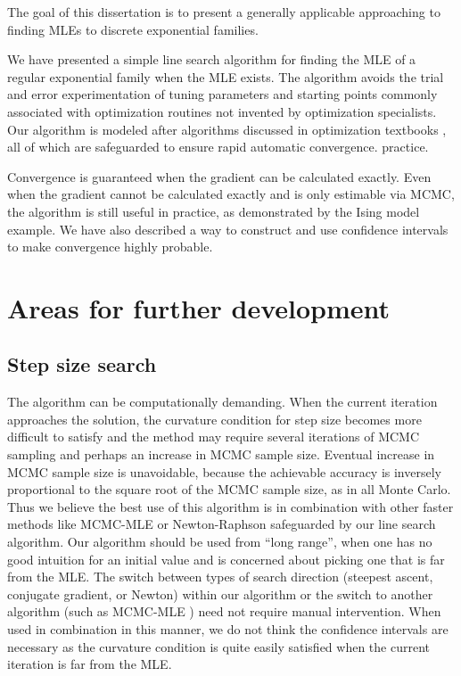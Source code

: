 The goal of this dissertation is to present a generally applicable approaching
to finding MLEs to discrete exponential families.

We have presented a simple line search algorithm for finding the MLE of a regular 
exponential family when the MLE 
exists.  The algorithm avoids the trial and error experimentation of tuning parameters 
and starting points commonly associated with optimization routines
not invented by optimization specialists.  Our algorithm is modeled after algorithms 
discussed in optimization textbooks \citep{Fletcher,NW,Sun:2006},
all of which are safeguarded to ensure rapid automatic convergence.
practice.

Convergence is guaranteed when the gradient can be calculated exactly.  Even when the 
gradient cannot be calculated 
exactly and is only estimable via MCMC, the algorithm is still useful in practice, as 
demonstrated by the Ising model 
example.  We have also described a way to construct and use confidence intervals to 
make convergence highly probable.


\section{Areas for further development}
\subsection{Step size search}
The algorithm can be computationally demanding.  When the current iteration approaches 
the solution, the 
curvature condition for step size becomes more difficult to satisfy and the method may 
require several iterations of 
MCMC sampling and perhaps an increase in MCMC sample size.  Eventual increase in MCMC 
sample size is unavoidable,
because the achievable accuracy is inversely proportional to the square root of the 
MCMC sample size, as in all Monte Carlo.
Thus we believe the best use of this algorithm is in combination with other faster 
methods like MCMC-MLE \citep{Geyer:1992}
or Newton-Raphson safeguarded by our line search algorithm.  Our 
algorithm should be used from ``long range'', when one has no good intuition for an 
initial value and is concerned about 
picking one that is far from the MLE.  The switch between types of search direction 
(steepest ascent, conjugate gradient,
or Newton) within our algorithm or the switch to another algorithm (such as MCMC-MLE 
\citep{Geyer:1992})
need not require manual intervention.  When used in combination in this
manner, we do not think the confidence intervals are necessary as the curvature 
condition is quite easily satisfied 
when the current iteration is far from the MLE.


